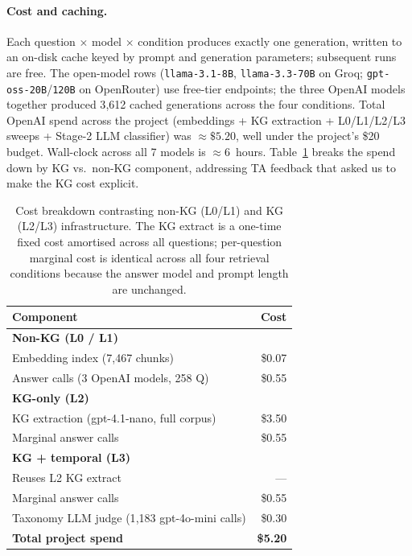 \documentclass[11pt]{article}
\begin{document}
\paragraph{Cost and caching.}
Each question $\times$ model $\times$ condition produces exactly one
generation, written to an on-disk cache keyed by prompt and generation
parameters; subsequent runs are free. The open-model rows
(\texttt{llama-3.1-8B}, \texttt{llama-3.3-70B} on Groq;
\texttt{gpt-oss-20B}/\texttt{120B} on OpenRouter) use free-tier
endpoints; the three OpenAI models together produced 3{,}612 cached
generations across the four conditions. Total OpenAI spend across the
project (embeddings + KG extraction + L0/L1/L2/L3 sweeps + Stage-2
LLM classifier) was \textbf{$\approx \$5.20$}, well under the project's
\$20 budget. Wall-clock across all 7 models is $\approx 6$~hours.
Table~\ref{tab:cost} breaks the spend down by KG vs.\ non-KG component,
addressing TA feedback that asked us to make the KG cost explicit.

\begin{table}[h]
\centering
\footnotesize
\setlength{\tabcolsep}{4pt}
\begin{tabular}{lr}
\toprule
Component & Cost \\
\midrule
\textbf{Non-KG (L0 / L1)} & \\
\quad Embedding index (7{,}467 chunks) & \$0.07 \\
\quad Answer calls (3 OpenAI models, 258 Q) & \$0.55 \\
\midrule
\textbf{KG-only (L2)} & \\
\quad KG extraction (gpt-4.1-nano, full corpus) & \$3.50 \\
\quad Marginal answer calls & \$0.55 \\
\midrule
\textbf{KG + temporal (L3)} & \\
\quad Reuses L2 KG extract & --- \\
\quad Marginal answer calls & \$0.55 \\
\midrule
Taxonomy LLM judge (1{,}183 gpt-4o-mini calls) & \$0.30 \\
\midrule
\textbf{Total project spend} & \textbf{\$5.20} \\
\bottomrule
\end{tabular}
\caption{Cost breakdown contrasting non-KG (L0/L1) and KG (L2/L3)
infrastructure. The KG extract is a one-time fixed cost amortised
across all questions; per-question marginal cost is identical across
all four retrieval conditions because the answer model and prompt
length are unchanged.}
\label{tab:cost}
\end{table}
\end{document}
